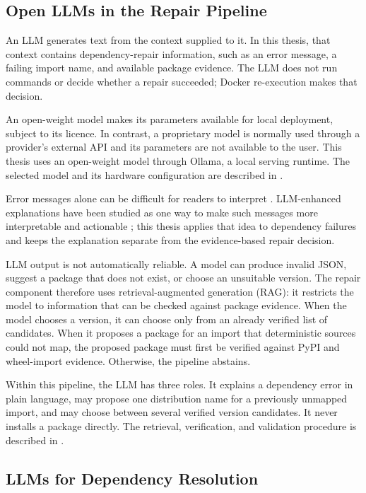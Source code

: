 \subsection{Open LLMs in the Repair Pipeline}
\label{sec:rw-llm-primer}

An LLM generates text from the context supplied to it. In this thesis, that
context contains dependency-repair information, such as an error message, a
failing import name, and available package evidence. The LLM does not run
commands or decide whether a repair succeeded; Docker re-execution makes that
decision.

An open-weight model makes its parameters available for local deployment,
subject to its licence. In contrast, a proprietary model is normally used
through a provider's external API and its parameters are not available to the
user. This thesis uses an open-weight model through Ollama, a local serving
runtime. The selected model and its hardware configuration are described in
.

Error messages alone can be difficult for readers to interpret
\cite{becker2019errormessages}. LLM-enhanced explanations have been studied as
one way to make such messages more interpretable and actionable
\cite{leinonen2023errormessages}; this thesis applies that idea to dependency
failures and keeps the explanation separate from the evidence-based repair
decision.

LLM output is not automatically reliable. A model can produce invalid JSON,
suggest a package that does not exist, or choose an unsuitable version. The
repair component therefore uses retrieval-augmented generation (RAG): it
restricts the model to information that can be checked against package
evidence. When the model chooses a version, it can choose only from an
already verified list of candidates. When it proposes a package for an import
that deterministic sources could not map, the proposed package must first be
verified against PyPI and wheel-import evidence. Otherwise, the pipeline
abstains.

Within this pipeline, the LLM has three roles. It explains a dependency error
in plain language, may propose one distribution name for a previously unmapped
import, and may choose between several verified version candidates. It never
installs a package directly. The retrieval, verification, and validation
procedure is described in .

\subsection{LLMs for Dependency Resolution}
\label{sec:rw-llm-dep}

